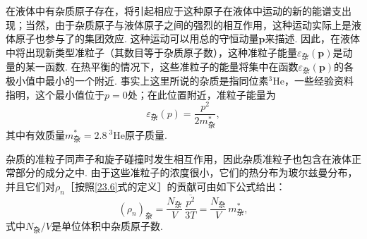 在液体中有杂质原子存在，将引起相应于这种原子在液体中运动的新的能谱支出现；当然，由于杂质原子与液体原子之间的强烈的相互作用，这种运动实际上是液体原子也参与了的集团效应. 这种运动可以用总的守恒动量$\bm{p}$来描述. 因此，在液体中将出现新类型准粒子（其数目等于杂质原子数），这种准粒子能量$\varepsilon_{\text{杂}}(\bm{p})$是动量的某一函数. 在热平衡的情况下，这些准粒子的能量将集中在函数$\varepsilon_{\text{杂}}(\bm{p})$的各极小值中最小的一个附近. 事实上这里所说的杂质是指同位素$^{3}\mathrm{He}$，一些经验资料指明，这个最小值位于$p=0$处；在此位置附近，准粒子能量为
\begin{equation}
\varepsilon_{\text{杂}}(p)=\frac{p^{2}}{2m^{*}_{\text{杂}}},
\label{23.9}
\end{equation}
其中有效质量$m^{*}_{\text{杂}}=2.8\ ^{3}\mathrm{He}$原子质量.

杂质的准粒子同声子和旋子碰撞时发生相互作用，因此杂质准粒子也包含在液体正常部分的成分之中. 由于这些准粒子的浓度很小，它们的热分布为玻尔兹曼分布，并且它们对$\rho_{n}$［按照\eqref{23.6}式的定义］的贡献可由如下公式给出：
\begin{equation}
(\rho_{n})_{\text{杂}}=\frac{N_{\text{杂}}}{V}\,\frac{\overline{p^{2}}}{3T}=\frac{N_{\text{杂}}}{V}\,m^{*}_{\text{杂}},
\label{23.10}
\end{equation}
式中$N_{\text{杂}}/V$是单位体积中杂质原子数.

